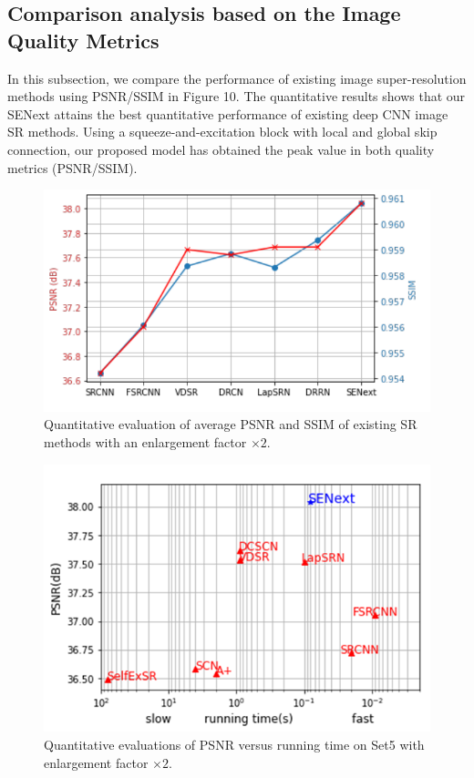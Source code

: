 \documentclass{ieeeaccess}
\begin{document}
\subsection{Comparison analysis based on the Image Quality Metrics}
In this subsection, we compare the performance of existing image super-resolution methods using PSNR/SSIM in Figure 10. The quantitative results shows that our SENext attains the best quantitative performance of existing deep CNN image SR methods. Using a squeeze-and-excitation block with local and global skip connection, our proposed model has obtained the peak value in both quality metrics (PSNR/SSIM).


\begin{figure}[ht]
  \includegraphics[width=\linewidth]{10FIGURE.pdf}
  \caption{Quantitative evaluation of average PSNR and SSIM of existing SR methods with an enlargement factor $\times2$.}
  \label{fig:10}
\end{figure}


\begin{figure}[ht]
  \includegraphics[width=\linewidth]{11FIGURE.pdf}
  \caption{Quantitative evaluations of PSNR versus running time on Set5 with enlargement factor $\times2$.}
  \label{fig:11}
\end{figure}
\end{document}
